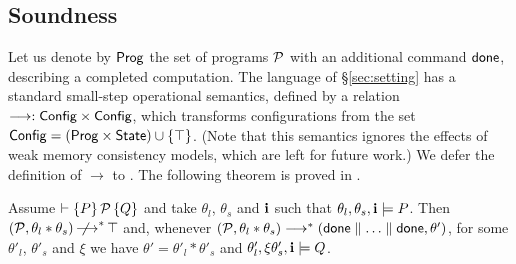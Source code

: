  
\subsection{Soundness\label{sec:semantics}}
Let us denote by ${\sf Prog}$ the set of programs $\mathcal{P}$ with an additional command
${\sf done}$, describing a completed computation. The language of
\S\ref{sec:setting} has a standard small-step operational semantics, defined by
a relation $\longrightarrow : {\sf Config} \times {\sf Config}$, which transforms
configurations from the set ${\sf Config} = ({\sf Prog} \times {\sf State})\cup {\{\top\}}$. 
(Note that this semantics ignores the effects of weak memory consistency models,
which are left for future work.)
We defer the definition of $\longrightarrow$ to
\tr{\ref{app:formal}}{\nformal}. The following theorem is proved in
\tr{\ref{app:soundness}}{\nsoundness}.
\begin{theorem}[Soundness]\label{real:soundness}
  Assume $\vdash \{P\}\,\mathcal{P}\,\{Q\}$ and take $\theta_l$, $\theta_s$ and ${\bf i}$
  such that $\theta_l, \theta_s,{\bf i} \models P$. Then $(\mathcal{P},\theta_l *
  \theta_s) \mathop{\,\,\not\!\!\longrightarrow}^* \top$ and, whenever $(\mathcal{P}, \theta_l * \theta_s)
  \longrightarrow^* ({\sf done} \parallel \ldots \parallel {\sf done}, \theta')$, for some
  $\theta'_l$, $\theta'_s$ and $\xi$ we have $\theta' = \theta'_l * \theta'_s$ and
  $\theta'_l,\xi\theta'_s,{\bf i} \models Q$.
\end{theorem}

